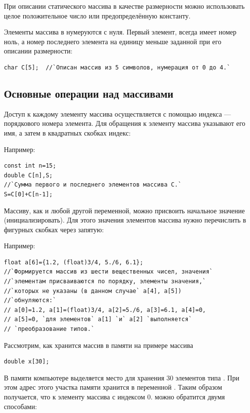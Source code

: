 При описании статического массива в качестве размерности можно использовать целое положительное число или
предопределённую константу.

Элементы массива в  нумеруются с нуля. Первый элемент, всегда имеет номер ноль, а номер последнего элемента на
единицу меньше заданной при его описании размерности: 
\begin{lstlisting}
char C[5];  //`Описан массив из 5 символов, нумерация от 0 до 4.`
\end{lstlisting}

\subsection[Основные операции над массивами]{Основные операции над массивами}
Доступ к каждому элементу массива осуществляется с помощью индекса --- порядкового номера элемента. Для обращения к
элементу массива указывают его имя, а затем в квадратных скобках индекс:


Например:
\begin{lstlisting}
const int n=15; 
double C[n],S;
//`Сумма первого и последнего элементов массива С.`
S=C[0]+C[n-1];
\end{lstlisting}

Массиву, как и любой другой переменной, можно присвоить начальное значение (инициализировать). Для этого значения
элементов массива нужно перечислить в фигурных скобках через запятую:

{\small{}}

Например:
\begin{lstlisting}
float a[6]={1.2, (float)3/4, 5./6, 6.1}; 
//`Формируется массив из шести вещественных чисел, значения`
//`элементам присваиваются по порядку, элементы значения,`
//`которых не указаны (в данном случае` a[4], a[5])
//`обнуляются:`
// a[0]=1.2, a[1]=(float)3/4, a[2]=5./6, a[3]=6.1, a[4]=0,
// a[5]=0, `для элементов` a[1] `и` a[2] `выполняется`
// `преобразование типов.`
\end{lstlisting}
Рассмотрим, как хранится массив в памяти на примере массива
\begin{lstlisting}
double x[30];
\end{lstlisting}
В памяти компьютере выделяется место для хранения 30 элементов типа . При этом адрес этого
участка памяти хранится в переменной . Таким образом получается, что к элементу массива с индексом
0. можно обратится двумя способами:

